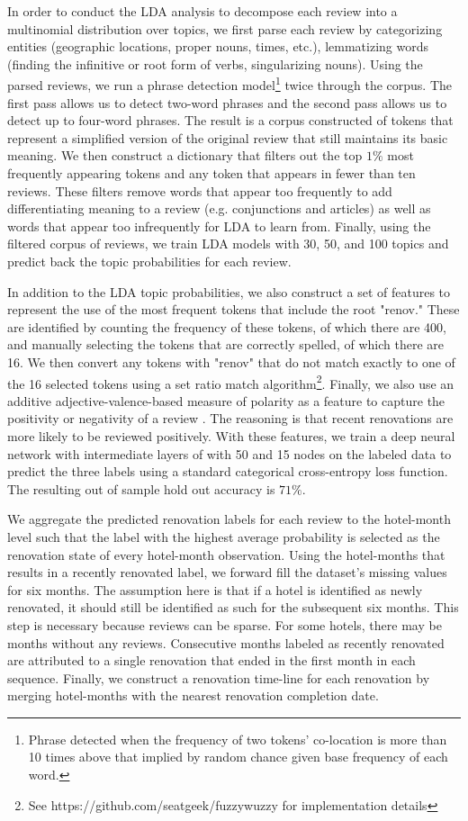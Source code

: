 \documentclass[mksc,blindrev]{informs3} %
\begin{document}
In order to conduct the LDA analysis to decompose each review into a multinomial distribution over topics, we first parse each review by categorizing entities (geographic locations, proper nouns, times, etc.), lemmatizing words (finding the infinitive or root form of verbs, singularizing nouns). Using the parsed reviews, we run a phrase detection model\footnote{Phrase detected when the frequency of two tokens' co-location is more than 10 times above that implied by random chance given base frequency of each word.} twice through the corpus. The first pass allows us to detect two-word phrases and the second pass allows us to detect up to four-word phrases. The result is a corpus constructed of tokens that represent a simplified version of the original review that still maintains its basic meaning. We then construct a dictionary that filters out the top $1\%$ most frequently appearing tokens and any token that appears in fewer than ten reviews. These filters remove words that appear too frequently to add differentiating meaning to a review (e.g. conjunctions and articles) as well as words that appear too infrequently for LDA to learn from. Finally, using the filtered corpus of reviews, we train LDA models with 30, 50, and 100 topics and predict back the topic probabilities for each review. 

In addition to the LDA topic probabilities, we also construct a set of features to represent the use of the most frequent tokens that include the root "renov." These are identified by counting the frequency of these tokens, of which there are 400, and manually selecting the tokens that are correctly spelled, of which there are 16. We then convert any tokens with "renov" that do not match exactly to one of the 16 selected tokens using a set ratio match algorithm\footnote{See https://github.com/seatgeek/fuzzywuzzy for implementation details}. Finally, we also use an additive adjective-valence-based measure of polarity as a feature to capture the positivity or negativity of a review . The reasoning is that recent renovations are more likely to be reviewed positively. With these features, we train a deep neural network with intermediate layers of with 50 and 15 nodes on the labeled data to predict the three labels using a standard categorical cross-entropy loss function. The resulting out of sample hold out accuracy is $71\%$. 

We aggregate the predicted renovation labels for each review to the hotel-month level such that the label with the highest average probability is selected as the renovation state of every hotel-month observation. Using the hotel-months that results in a recently renovated label, we forward fill the dataset's missing values for six months. The assumption here is that if a hotel is identified as newly renovated, it should still be identified as such for the subsequent six months. This step is necessary because reviews can be sparse. For some hotels, there may be months without any reviews. Consecutive months labeled as recently renovated are attributed to a single renovation that ended in the first month in each sequence. Finally, we construct a renovation time-line for each renovation by merging hotel-months with the nearest renovation completion date. 
\end{document}
